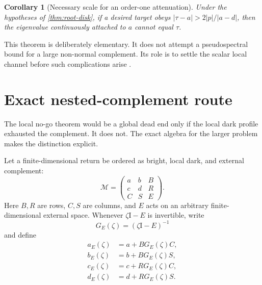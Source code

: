 \documentclass[11pt]{article}
\newtheorem{corollary}[theorem]{Corollary}
\theoremstyle{definition}
\theoremstyle{remark}
\newcommand{\Id}{\mathrm I}
\newcommand{\cM}{\mathcal M}
\begin{document}
\begin{corollary}[Necessary scale for an order-one attenuation]
\label{cor:necessary-scale}
Under the hypotheses of \cref{thm:root-disk}, if a desired target obeys
$|\tau-a|>2|p|/|a-d|$, then the eigenvalue continuously attached to $a$
cannot equal $\tau$.
\end{corollary}

This theorem is deliberately elementary.  It does not attempt a
pseudospectral bound for a large non-normal complement.  Its role is to
settle the scalar local channel before such complications arise
\citep{Kato1995,StewartSun1990,TrefethenEmbree2005}.

\section{Exact nested-complement route}
\label{sec:nested-schur}

The local no-go theorem would be a global dead end only if the local dark
profile exhausted the complement.  It does not.  The exact algebra for the
larger problem makes the distinction explicit.

Let a finite-dimensional return be ordered as bright, local dark, and
external complement:
\begin{equation}\label{eq:three-block-matrix}
 \cM=
 \begin{pmatrix}
  a&b&B\\
  c&d&R\\
  C&S&E
 \end{pmatrix}.
\end{equation}
Here $B,R$ are rows, $C,S$ are columns, and $E$ acts on an arbitrary
finite-dimensional external space.  Whenever $\zeta\Id-E$ is invertible,
write
\begin{equation}\label{eq:external-resolvent}
 G_E(\zeta)=(\zeta\Id-E)^{-1}
\end{equation}
and define
\begin{align}
 a_E(\zeta)&=a+B G_E(\zeta)C,
 \label{eq:a-effective}\\
 b_E(\zeta)&=b+B G_E(\zeta)S,
 \label{eq:b-effective}\\
 c_E(\zeta)&=c+R G_E(\zeta)C,
 \label{eq:c-effective}\\
 d_E(\zeta)&=d+R G_E(\zeta)S.
 \label{eq:d-effective}
\end{align}
\end{document}
